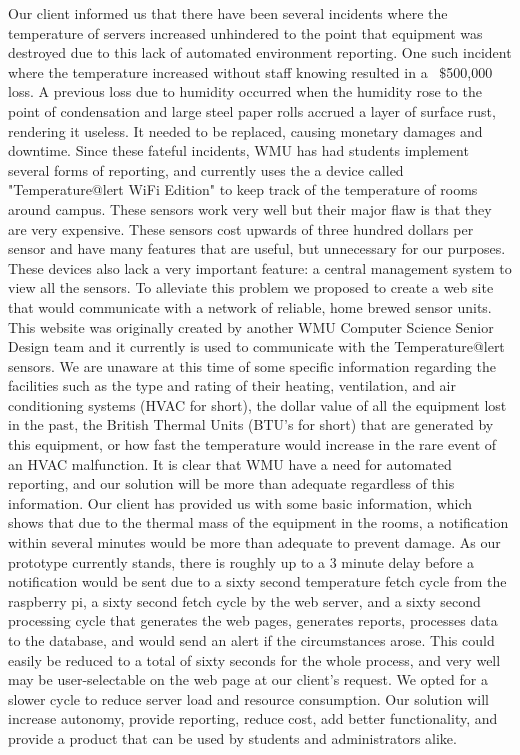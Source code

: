 \documentclass{report}
\begin{document}
\newline
\indent
Our client informed us that there have been several incidents where the temperature of servers increased unhindered to the point that equipment was destroyed due to this lack of automated environment reporting. One such incident where the temperature increased without staff knowing resulted in a ~$\$$500,000 loss. A previous loss due to humidity occurred when the humidity rose to the point of condensation and large steel paper rolls accrued a layer of surface rust, rendering it useless. It needed to be replaced, causing monetary damages and downtime.
\newline
\indent
Since these fateful incidents, WMU has had students implement several forms of reporting, and currently uses the a device called "Temperature@lert WiFi Edition" to keep track of the temperature of rooms around campus. These sensors work very well but their major flaw is that they are very expensive. These sensors cost upwards of three hundred dollars per sensor and have many features that are useful, but unnecessary for our purposes. These devices also lack a very important feature: a central management system to view all the sensors. To alleviate this problem we proposed to create a web site that would communicate with a network of reliable, home brewed sensor units. This website was originally created by another WMU Computer Science Senior Design team and it currently is used to communicate with the Temperature@lert sensors.
\newline
\indent  
We are unaware at this time of some specific information regarding the facilities such as the type and rating of their heating, ventilation, and air conditioning systems (HVAC for short), the dollar value of all the equipment lost in the past, the British Thermal Units (BTU’s for short) that are generated by this equipment, or how fast the temperature would increase in the rare event of an HVAC malfunction. It is clear that WMU have a need for automated reporting, and our solution will be more than adequate regardless of this information. Our client has provided us with some basic information, which shows that due to the thermal mass of the equipment in the rooms, a notification within several minutes would be more than adequate to prevent damage. As our prototype currently stands, there is roughly up to a 3 minute delay before a notification would be sent due to a sixty second temperature fetch cycle from the raspberry pi, a sixty second fetch cycle by the web server, and a sixty second processing cycle that generates the web pages, generates reports, processes data to the database, and would send an alert if the circumstances arose. This could easily be reduced to a total of sixty seconds for the whole process, and very well may be user-selectable on the web page at our client's request. We opted for a slower cycle to reduce server load and resource consumption. Our solution will increase autonomy, provide reporting, reduce cost, add better functionality, and provide a product that can be used by students and administrators alike.
\end{document}
